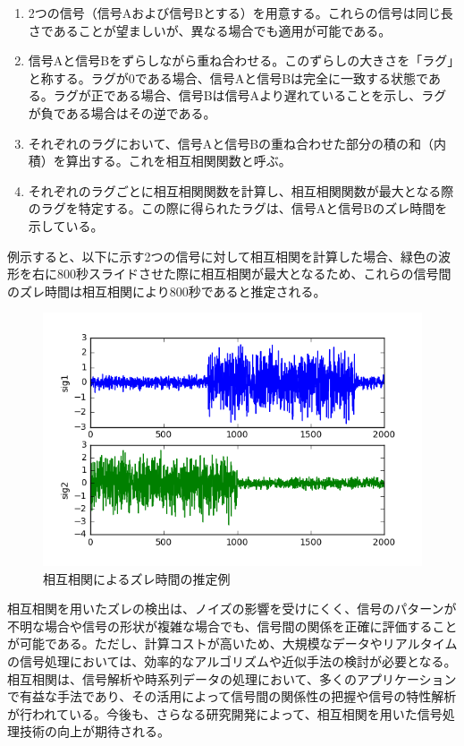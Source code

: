 \documentclass[a4j,12pt,]{jarticle}
\begin{document}
\begin{enumerate}
\item 2つの信号（信号Aおよび信号Bとする）を用意する。これらの信号は同じ長さであることが望ましいが、異なる場合でも適用が可能である。
\item 信号Aと信号Bをずらしながら重ね合わせる。このずらしの大きさを「ラグ」と称する。ラグが0である場合、信号Aと信号Bは完全に一致する状態である。ラグが正である場合、信号Bは信号Aより遅れていることを示し、ラグが負である場合はその逆である。
\item それぞれのラグにおいて、信号Aと信号Bの重ね合わせた部分の積の和（内積）を算出する。これを相互相関関数と呼ぶ。
\item それぞれのラグごとに相互相関関数を計算し、相互相関関数が最大となる際のラグを特定する。この際に得られたラグは、信号Aと信号Bのズレ時間を示している。
\end{enumerate}

例示すると、以下に示す2つの信号に対して相互相関を計算した場合、緑色の波形を右に800秒スライドさせた際に相互相関が最大となるため、これらの信号間のズレ時間は相互相関により800秒であると推定される。

\begin{figure}[H]
  \begin{center}
    \includegraphics[width=160mm]{1.png}
    \caption{相互相関によるズレ時間の推定例}
    \label{p1}
  \end{center}
\end{figure}

相互相関を用いたズレの検出は、ノイズの影響を受けにくく、信号のパターンが不明な場合や信号の形状が複雑な場合でも、信号間の関係を正確に評価することが可能である。ただし、計算コストが高いため、大規模なデータやリアルタイムの信号処理においては、効率的なアルゴリズムや近似手法の検討が必要となる。相互相関は、信号解析や時系列データの処理において、多くのアプリケーションで有益な手法であり、その活用によって信号間の関係性の把握や信号の特性解析が行われている。今後も、さらなる研究開発によって、相互相関を用いた信号処理技術の向上が期待される。
\end{document}
